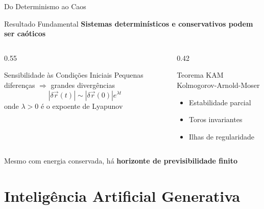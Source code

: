 \documentclass[aspectratio=169,12pt]{beamer}
\begin{document}
\begin{frame}{Do Determinismo ao Caos}
    \begin{alertblock}{Resultado Fundamental}
        \textbf{Sistemas determinísticos e conservativos podem ser caóticos}
    \end{alertblock}
    \vspace{-0.2cm}
    \begin{columns}[T]
        \begin{column}{0.55\textwidth}
            \begin{block}{Sensibilidade às Condições Iniciais}
                Pequenas diferenças $\Rightarrow$ grandes divergências
                \begin{equation*}
                    |\delta \vec{r}(t)| \sim |\delta \vec{r}(0)| e^{\lambda t}
                \end{equation*}
                onde $\lambda > 0$ é o expoente de Lyapunov
            \end{block}
        \end{column}
        \begin{column}{0.42\textwidth}
            \begin{block}{Teorema KAM}
                \small
                Kolmogorov-Arnold-Moser
                \begin{itemize}
                    \item Estabilidade parcial
                    \item Toros invariantes
                    \item Ilhas de regularidade
                \end{itemize}
            \end{block}
        \end{column}
    \end{columns}
    \vspace{-0.1cm}
    \begin{block}{}
        \centering
        Mesmo com energia conservada, há \textbf{horizonte de previsibilidade finito}
    \end{block}
\end{frame}

\section{Inteligência Artificial Generativa}
\end{document}
